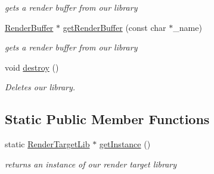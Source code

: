 \begin{DoxyCompactItemize}
\begin{DoxyCompactList}\small\item\em gets a render buffer from our library \end{DoxyCompactList}\item 
\hypertarget{class_render_target_lib_aeda9a8138eef8e87558431809933074b}{\hyperlink{class_render_buffer}{Render\-Buffer} $\ast$ \hyperlink{class_render_target_lib_aeda9a8138eef8e87558431809933074b}{get\-Render\-Buffer} (const char $\ast$\-\_\-name)}\label{class_render_target_lib_aeda9a8138eef8e87558431809933074b}

\begin{DoxyCompactList}\small\item\em gets a render buffer from our library \end{DoxyCompactList}\item 
\hypertarget{class_render_target_lib_a71b6707d4e877c56cf167bee8995ff6a}{void \hyperlink{class_render_target_lib_a71b6707d4e877c56cf167bee8995ff6a}{destroy} ()}\label{class_render_target_lib_a71b6707d4e877c56cf167bee8995ff6a}

\begin{DoxyCompactList}\small\item\em Deletes our library. \end{DoxyCompactList}\end{DoxyCompactItemize}
\subsection*{Static Public Member Functions}
\begin{DoxyCompactItemize}
\item 
\hypertarget{class_render_target_lib_a99e969c4379b3c037b3152ae4603e436}{static \hyperlink{class_render_target_lib}{Render\-Target\-Lib} $\ast$ \hyperlink{class_render_target_lib_a99e969c4379b3c037b3152ae4603e436}{get\-Instance} ()}\label{class_render_target_lib_a99e969c4379b3c037b3152ae4603e436}

\begin{DoxyCompactList}\small\item\em returns an instance of our render target library \end{DoxyCompactList}\end{DoxyCompactItemize}
